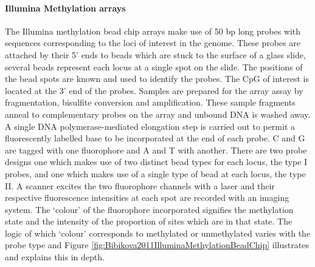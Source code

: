 \documentclass[]{book}
\let\oldparagraph\paragraph
\renewcommand{\paragraph}[1]{\oldparagraph{#1}\mbox{}}
\begin{document}
\hypertarget{illumina-methylation-arrays}{%
\paragraph{Illumina Methylation arrays}\label{illumina-methylation-arrays}}

The Illumina methylation bead chip arrays make use of 50 bp long probes with sequences corresponding to the loci of interest in the genome. These probes are attached by their 5' ends to beads which are stuck to the surface of a glass slide, several beads represent each locus at a single spot on the slide. The positions of the bead spots are known and used to identify the probes. The CpG of interest is located at the 3' end of the probes. Samples are prepared for the array assay by fragmentation, bisulfite conversion and amplification. These sample fragments anneal to complementary probes on the array and unbound DNA is washed away. A single DNA polymerase-mediated elongation step is carried out to permit a fluorescently labelled base to be incorporated at the end of each probe. C and G are tagged with one fluorophore and A and T with another. There are two probe designs one which makes use of two distinct bead types for each locus, the type I probes, and one which makes use of a single type of bead at each locus, the type II. A scanner excites the two fluorophore channels with a laser and their respective fluorescence intensities at each spot are recorded with an imaging system. The `colour' of the fluorophore incorporated signifies the methylation state and the intensity of the proportion of sites which are in that state. The logic of which `colour' corresponds to methylated or unmethylated varies with the probe type and Figure \ref{fig:Bibikova2011IlluminaMethylationBeadChip} illustrates and explains this in depth.
\end{document}
